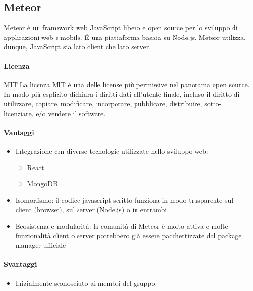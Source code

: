 \subsection{Meteor}

Meteor è un framework web JavaScript libero e open source  per lo
sviluppo di applicazioni web e mobile. \'E una piattaforma basata su
Node.js. Meteor utilizza, dunque, JavaScript sia lato client che lato
server.  
\\
\paragraph{Licenza} MIT 
La licenza MIT è una delle licenze più permissive nel panorama open
source. In modo più esplicito dichiara i diritti dati all'utente
finale, incluso il diritto di utilizzare, copiare, modificare,
incorporare, pubblicare, distribuire, sotto-licenziare, e/o vendere il
software. 


\paragraph{Vantaggi}
\begin{itemize}
	\item Integrazione con diverse tecnologie utilizzate nello sviluppo web:
	\begin{itemize}
		\item React
		\item MongoDB
	\end{itemize}
	\item Isomorfismo: il codice javascript scritto funziona in modo trasparente sul client (browser), sul server (Node.js) o in entrambi
	\item Ecosistema e modularità: la comunità di Meteor è molto attiva
     e molte funzionalità client o server potrebbero già essere
     pacchettizzate dal package manager ufficiale 
\end{itemize}

\paragraph{Svantaggi} %
\begin{itemize}
	\item Inizialmente sconosciuto ai membri del gruppo.
\end{itemize}

